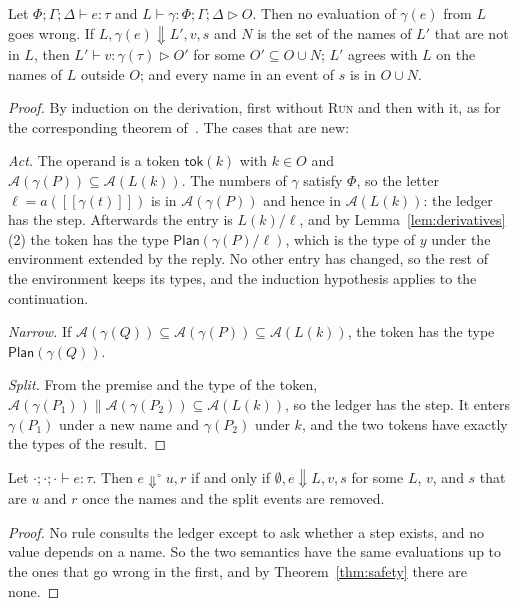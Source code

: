 \documentclass[acmsmall,nonacm,screen]{acmart}
\newcommand{\kw}[1]{\mathsf{#1}}
\newcommand{\Plan}[1]{\kw{Plan}(#1)}
\newcommand{\tok}[1]{\kw{tok}(#1)}
\newcommand{\sem}[1]{[\![#1]\!]}
\newcommand{\auth}[1]{\mathcal{A}(#1)}
\newcommand{\sh}{\mathbin{\parallel}}
\newcommand{\evto}{\Downarrow}
\newcommand{\own}{\mathrel{\triangleright}}
\begin{document}
\begin{theorem}[Safety]
\label{thm:safety}
Let $\Phi; \Gamma; \Delta \vdash e : \tau$ and $L \vdash \gamma : \Phi; \Gamma; \Delta \own O$.
Then no evaluation of $\gamma(e)$ from $L$ goes wrong. If $L, \gamma(e) \evto L', v, s$ and
$N$ is the set of the names of $L'$ that are not in $L$, then
$L' \vdash v : \gamma(\tau) \own O'$ for some $O' \subseteq O \cup N$; $L'$ agrees with $L$
on the names of $L$ outside $O$; and every name in an event of $s$ is in $O \cup N$.
\end{theorem}

\begin{proof}
By induction on the derivation, first without \textsc{Run} and then with it, as for the
corresponding theorem of~\citet{tpp4}. The cases that are new:

\emph{Act.} The operand is a token $\tok{k}$ with $k \in O$ and
$\auth{\gamma(P)} \subseteq \auth{L(k)}$. The numbers of $\gamma$ satisfy $\Phi$, so the
letter $\ell = a(\sem{\gamma(t)})$ is in $\auth{\gamma(P)}$ and hence in $\auth{L(k)}$: the
ledger has the step. Afterwards the entry is $L(k) / \ell$, and by
Lemma~\ref{lem:derivatives}(2) the token has the type $\Plan{\gamma(P) / \ell}$, which is
the type of $y$ under the environment extended by the reply. No other entry has changed, so
the rest of the environment keeps its types, and the induction hypothesis applies to the
continuation.

\emph{Narrow.} If $\auth{\gamma(Q)} \subseteq \auth{\gamma(P)} \subseteq \auth{L(k)}$, the
token has the type $\Plan{\gamma(Q)}$.

\emph{Split.} From the premise and the type of the token,
$\auth{\gamma(P_1)} \sh \auth{\gamma(P_2)} \subseteq \auth{L(k)}$, so the ledger has the
step. It enters $\gamma(P_1)$ under a new name and $\gamma(P_2)$ under $k$, and the two
tokens have exactly the types of the result.
\end{proof}

\begin{theorem}[Erasure]
\label{thm:erasure}
Let $\cdot; \cdot; \cdot \vdash e : \tau$. Then $e \evto^{\circ} u, r$ if and only if
$\emptyset, e \evto L, v, s$ for some $L$, $v$, and $s$ that are $u$ and $r$ once the names
and the split events are removed.
\end{theorem}

\begin{proof}
No rule consults the ledger except to ask whether a step exists, and no value depends on a
name. So the two semantics have the same evaluations up to the ones that go wrong in the
first, and by Theorem~\ref{thm:safety} there are none.
\end{proof}
\end{document}
